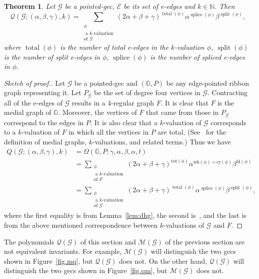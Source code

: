 \documentclass{amsart}
\newcommand{\bG}{\mathbb{G}}
\newcommand{\E}{\mathcal{E}}
\newcommand{\Q}{\mathcal{Q}}
\newcommand{\gec}[1]{\mathcal{#1}}
\newcommand{\calM}{\mathcal{M}}
\DeclareMathOperator{\ksplit}{split}
\DeclareMathOperator{\ksplice}{splice}
\DeclareMathOperator{\ktotal}{total}
\newtheorem{theorem}{Theorem}[section]
\theoremstyle{definition}
\theoremstyle{remark}
\numberwithin{equation}{section}
\begin{document}
\begin{theorem} \label{thm:kval}
Let $\gec{G}$ be a pointed-gec,  $\E$ be its set of e-edges and $k \in \mathbb{N}$. Then
\[\gec{Q}(\gec{G};(\alpha,\beta,\gamma),k)= 
\sum_{\substack{\phi \\ \text{ a $k$-valuation} \\ \text{of } \gec{G}}}
(2\alpha+\beta+\gamma)^{\ktotal(\phi)} \alpha^{\ksplice(\phi)} \beta^{\ksplit(\phi)},\]
where $\ktotal(\phi)$ is the number of total e-edges  in the $k$-valuation $\phi$, $\ksplit(\phi)$ is the number of split e-edges  in $\phi$, 
$\ksplice(\phi)$ is the number of spliced e-edges in $\phi$.
\end{theorem}
\begin{proof}[Sketch of proof.]
Let $\gec{G}$ be a pointed-gec and  $(\bG,P)$ be any edge-pointed ribbon graph representing it. Let $P_{\gec{G}}$ be the set of degree four vertices in $\gec{G}$.
Contracting all of the e-edges of  $\gec{G}$ results in a 4-regular graph $F$. It is clear that  $F$ is the medial graph of $\bG$. Moreover, the vertices of $F$ that came from those in $P_{\gec{G}}$ correspond to the edges in $P$.
It is also clear that a $k$-valuation of $\gec{G}$ corresponds to a $k$-valuation of $F$  in which all the vertices in $P$ are total. (See~\cite[Section~1 and Definition~4.1]{zbMATH07021383} for the definition of medial graphs, $k$-valuations, and related terms.)
Thus we have
\begin{align*}
Q(\gec{G};(\alpha,\beta,\gamma),k) &= \Omega(\bG,P; \gamma, \alpha, \beta,\alpha, t)
\\&=
\sum_{\substack{\phi \\ \text{ a $k$-valuation} \\ \text{of } F}}  (2\alpha+\beta+\gamma)^{\mathrm{tot}(\phi)} \alpha^{\mathrm{wh}(\phi)+\mathrm{cr}(\phi)} \beta^{\mathrm{bl}(\phi)}
\\&=
\sum_{\substack{\phi \\ \text{ a $k$-valuation} \\ \text{of } \gec{G}}}
(2\alpha+\beta+\gamma)^{\ktotal(\phi)} \alpha^{\ksplice(\phi)} \beta^{\ksplit(\phi)},
\end{align*}
where the first equality is from Lemma~\ref{lem:dhg}, the second is~\cite[Theorem~4.2]{zbMATH07021383}, and the last is from the above mentioned correspondence between $k$-valuations of $\gec{G}$ and $F$.
\end{proof}



The polynomials $\Q(\gec{G})$ of this section and $\calM(\gec{G})$ of the previous section are not equivalent invariants. For example, $\calM(\gec{G})$ will distinguish the two gecs shown in Figure~\ref{fig.mq}, but $\Q(\gec{G})$ does not.  On the other hand, $\Q(\gec{G})$ will distinguish the two gecs shown in Figure~\ref{fig.qm}, but $\calM(\gec{G})$ does not.
\end{document}
